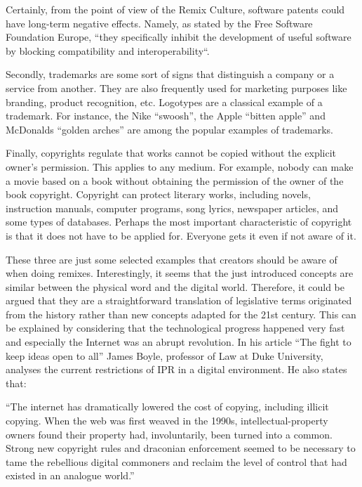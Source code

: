 Certainly, from the point of view of the Remix Culture, software patents could have long-term negative effects. Namely, as stated by the Free Software Foundation Europe, “they specifically inhibit the development of useful software by blocking compatibility and interoperability“.

Secondly, trademarks are some sort of signs that distinguish a company or a service from another. They are also frequently used for marketing purposes like branding, product recognition, etc. Logotypes are a classical example of a trademark. For instance, the Nike “swoosh”, the Apple “bitten apple” and McDonalds “golden arches” are among the popular examples of trademarks.

Finally, copyrights regulate that works cannot be copied without the explicit owner’s permission. This applies to any medium. For example, nobody can make a movie based on a book without obtaining the permission of the owner of the book copyright. Copyright can protect literary works, including novels, instruction manuals, computer programs, song lyrics, newspaper articles, and some types of databases. Perhaps the most important characteristic of copyright is that it does not have to be applied for. Everyone gets it even if not aware of it.

These three are just some selected examples that creators should be aware of when doing remixes. Interestingly, it seems that the just introduced concepts are similar between the physical word and the digital world. Therefore, it could be argued that they are a straightforward translation of legislative terms originated from the history rather than new concepts adapted for the 21st century. This can be explained by considering that the technological progress happened very fast and especially the Internet was an abrupt revolution. In his article “The fight to keep ideas open to all” James Boyle, professor of Law at Duke University, analyses the current restrictions of IPR in a digital environment. He also states that:

\begin{displayquote}
“The internet has dramatically lowered the cost of copying, including illicit copying. When the web was first weaved in the 1990s, intellectual-property owners found their property had, involuntarily, been turned into a common. Strong new copyright rules and draconian enforcement seemed to be necessary to tame the rebellious digital commoners and reclaim the level of control that had existed in an analogue world.”
\end{displayquote}

